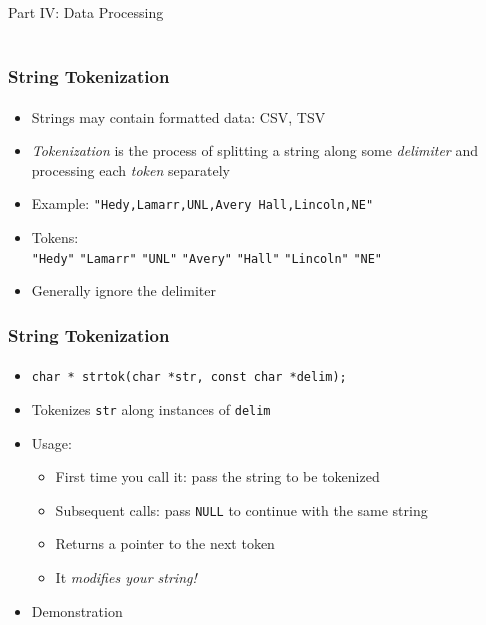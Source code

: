 \documentclass[]{beamer}
\begin{document}
\begin{frame}
    \frametitle{}
    \framesubtitle{}
    
    \begin{center}
    {\Huge Part IV: Data Processing}\\
    {\Large ~}
    
    \end{center}

\end{frame}

\begin{frame}[fragile]
    \frametitle{String Tokenization}
    \framesubtitle{}

\begin{itemize}[<+->]
  \item Strings may contain formatted data: CSV, TSV
  \item \emph{Tokenization} is the process of splitting a string along some 
  \emph{delimiter} and processing each \emph{token} separately
  \item Example: \texttt{"Hedy,Lamarr,UNL,Avery Hall,Lincoln,NE"}
  \item Tokens: \\
  \texttt{"Hedy"} \texttt{"Lamarr"} \texttt{"UNL"}
  \texttt{"Avery"} \texttt{"Hall"} \texttt{"Lincoln"}
  \texttt{"NE"}
  \item Generally ignore the delimiter
\end{itemize}

\end{frame}

\begin{frame}[fragile]
    \frametitle{String Tokenization}
    \framesubtitle{}
    
\begin{itemize}[<+->]
  \item \texttt{char * strtok(char *str, const char *delim);} 
  \item Tokenizes \texttt{str} along instances of \texttt{delim}
  \item Usage:
  \begin{itemize}
    \item First time you call it: pass the string to be tokenized
    \item Subsequent calls: pass \texttt{NULL} to continue with the same string
    \item Returns a pointer to the next token 
    \item It \emph{modifies your string!}
  \end{itemize}
  \item Demonstration
\end{itemize}

\end{frame}
\end{document}
